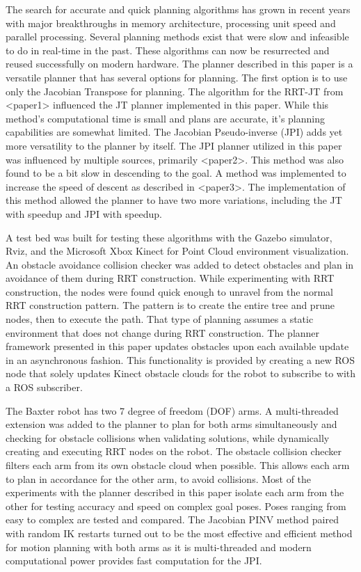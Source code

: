 \documentclass[conference]{IEEEtran} \usepackage[T1]{fontenc} \usepackage[backend=biber, style=ieee]{biblatex}
\begin{document}
The search for accurate and quick planning algorithms has grown in recent years with major breakthroughs in memory architecture, processing unit speed and 
parallel processing. Several planning methods exist that were slow and infeasible to do in real-time in the past. These algorithms can now be resurrected and 
reused successfully on modern hardware. The planner described in this paper is a versatile planner that has several options for planning. The first option is to 
use only the Jacobian Transpose for planning. The algorithm for the RRT-JT from <paper1> influenced the JT planner implemented in this paper.  While this 
method's computational time is small and plans are accurate, it's planning capabilities are somewhat limited. The Jacobian Pseudo-inverse (JPI) adds yet more 
versatility to the planner by itself. The JPI planner utilized in this paper was influenced by multiple sources, primarily <paper2>. This method was also found 
to be a bit slow in descending to the goal. A method was implemented to increase the speed of descent as described in <paper3>. The implementation of this method 
allowed the planner to have two more variations, including the JT with speedup and JPI with speedup. 

A test bed was built for testing these algorithms with the Gazebo simulator, Rviz, and the Microsoft Xbox Kinect for Point Cloud environment visualization. An 
obstacle avoidance collision checker was added to detect obstacles and plan in avoidance of them during RRT construction. While experimenting with RRT 
construction, the nodes were found quick enough to unravel from the normal RRT construction pattern. The pattern is to create the entire tree and prune nodes, 
then to execute the path. That type of planning assumes a static environment that does not change during RRT construction. The planner framework presented in 
this paper updates obstacles upon each available update in an asynchronous fashion. This functionality is provided by creating a new ROS node that solely updates 
Kinect obstacle clouds for the robot to subscribe to with a ROS subscriber.

The Baxter robot has two 7 degree of freedom (DOF) arms. A multi-threaded extension was added to the planner to plan for both arms simultaneously and checking 
for obstacle collisions when validating solutions, while dynamically creating and executing RRT nodes on the robot. The obstacle collision checker filters 
each arm from its own obstacle cloud when possible. This allows each arm to plan in accordance for the other arm, to avoid collisions. Most of the experiments 
with the planner described in this paper isolate each arm from the other for testing accuracy and speed on complex goal poses. Poses ranging from easy to 
complex are tested and compared. The Jacobian PINV method paired with random IK restarts turned out to be the most effective and efficient method for motion 
planning with both arms as it is multi-threaded and modern computational power provides fast computation for the JPI.
\end{document}
